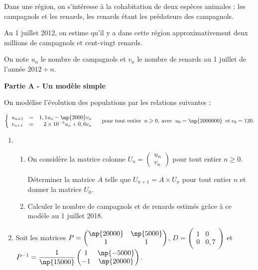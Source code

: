 \documentclass{cornouaille}
\begin{document}
\begin{exercice}
Dans une région, on s'intéresse à la cohabitation de deux espèces animales : les campagnols et les
renards, les renards étant les prédateurs des campagnols. 

Au 1 juillet 2012, on estime qu'il y a dans cette région approximativement deux millions de campagnols et cent-vingt renards.

On note $u_n$ le nombre de campagnols et $v_n$ le nombre de renards au 1 juillet de l'année $2012+ n$.

\bigskip

\textbf{Partie A - Un modèle simple}

\medskip

On modélise l'évolution des populations par les relations suivantes :

\[\left\{\begin{array}{l c r}
u_{n+1}& =& 1,1u_n - \np{2000}v_n\\
v_{n+1} &=& 2 \times 10^{-5}u_n + 0,6v_n
\end{array}\right. \quad \text{pour tout entier }\:n \geqslant 0,\: \text{avec } \:u_0 = \np{2000000}\:  \text{ et} \: v_0 = 120.\]

\medskip

\begin{enumerate}
\item 
	\begin{enumerate}
		\item On considère la matrice colonne $U_n = \begin{pmatrix}u_n\\v_n\end{pmatrix}$ pour tout entier $n \geqslant 0$.
		
Déterminer la matrice $A$ telle que $U_{n+1} = A \times U_n$ pour tout entier $n$ et donner la matrice $U_0$.
		\item Calculer le nombre de campagnols et de renards estimés grâce à ce modèle au 1 juillet
2018.
	\end{enumerate}
\item Soit les matrices $P = \begin{pmatrix}\np{20000}&\np{5000}\\1&1\end{pmatrix}$, \:$D = \begin{pmatrix}1&0\\0&0,7\end{pmatrix}$ et $P^{-1} = \dfrac{1}{\np{15000}}\begin{pmatrix}1& \np{-5000}\\- 1&\np{20000}\end{pmatrix}$.
	

\end{enumerate}
\end{exercice}
\end{document}

